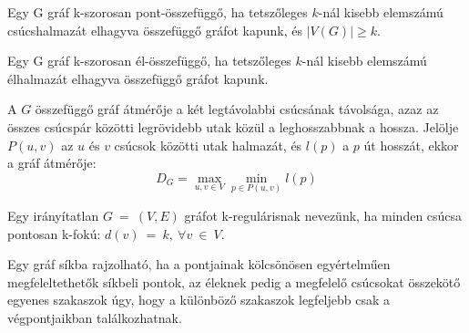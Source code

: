   \begin{definition} 
    Egy G gráf k-szorosan pont-összefüggő, ha tetszőleges $k$-nál kisebb elemszámú csúcshalmazát elhagyva összefüggő gráfot kapunk, és $|V(G)| \geq k$.
  \end{definition}
  \begin{definition} 
    Egy G gráf k-szorosan él-összefüggő, ha tetszőleges $k$-nál kisebb elemszámú élhalmazát elhagyva összefüggő gráfot kapunk.
  \end{definition}

  \iffalse
  Két alternatív definíció:
  \begin{definition} [k-szorosan pont-összefüggő gráf 2.]
    Egy G gráf k-szorosan pont-összefüggő, ha tetszőleges $k$-nál kisebb elemszámú csúcshalmazát elhagyva összefüggő gráfot kapunk, és $|V(G)| \geq k$.
  \end{definition}
  \begin{definition} [k-szorosan él-összefüggő gráf 2.]
    Egy G gráf k-szorosan él-összefüggő, ha tetszőleges $k$-nál kisebb elemszámú élhalmazát elhagyva összefüggő gráfot kapunk.
  \end{definition}
  \fi

  \begin{definition} 
    A $G$ összefüggő gráf átmérője a két legtávolabbi csúcsának távolsága, azaz az összes csúcspár közötti legrövidebb utak közül a leghosszabbnak a hossza. Jelölje $P(u, v)$ az $u$ és $v$ csúcsok közötti utak halmazát, és $l(p)$ a $p$ út hosszát, ekkor a gráf átmérője:\\
    $$D_G = \max_{u,v \in V} \min_{p \in P(u,v)} l(p)$$
  \end{definition}

  \iffalse

  \begin{definition} 
    Egy irányítatlan $G~=~(V,E)$ gráfot k-regulárisnak nevezünk, ha minden csúcsa pontosan k-fokú:
    $d(v)~=~k,~\forall v~\in~V.$
  \end{definition}

  \begin{definition} 
    Egy gráf síkba rajzolható, ha a pontjainak kölcsönösen egyértelműen megfeleltethetők síkbeli pontok, az éleknek pedig a megfelelő csúcsokat összekötő egyenes szakaszok úgy, hogy a különböző szakaszok legfeljebb csak a végpontjaikban találkozhatnak.
  \end{definition}

